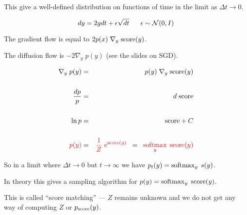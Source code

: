 {\vfill
This give a well-defined distribution on functions of time in the limit as $\Delta t \rightarrow 0$.

{\color{red} $$dy =  2 g dt + \epsilon \sqrt{dt}\;\;\;\;\;\; \epsilon \sim {\cal N}(0,I)$$}


The gradient flow is equal to $ 2 p(x) \;\nabla_y \;\mathrm{score}(y)$.

\vfill
The diffusion flow is  $- 2 \nabla _y\;p(y)$ (see the slides on SGD).

\vspace{-2ex}
\begin{eqnarray*}
\nabla_y\; p(y) & = & p(y)\; \nabla_y\; \mathrm{score}(y) \\
\\
\frac{dp}{p} & = & d\;\mathrm{score} \\
\\
\ln p & = & \mathrm{score} + C \\
\\
{\color{red} p(y)} & = & {\color{red} \frac{1}{Z}\;e^{\mathrm{score}(y)}} \;\;= \;\;{\color{red} \operatorname*{softmax}_y\;\mathrm{score}(y)}
\end{eqnarray*}


So in a limit where $\Delta t \rightarrow 0$ but $t \rightarrow \infty$ we have $p_t(y) = \operatorname*{softmax}_y\;s(y)$.

\vfill
In theory this gives a sampling algorithm for $p(y) = \operatorname*{softmax}_y \;\mathrm{score}(y)$.

\vfill
This is called ``score matching'' --- $Z$ remains unknown and we do not get any way of computing $Z$ or $p_{\mathrm{score}}(y)$.

}

